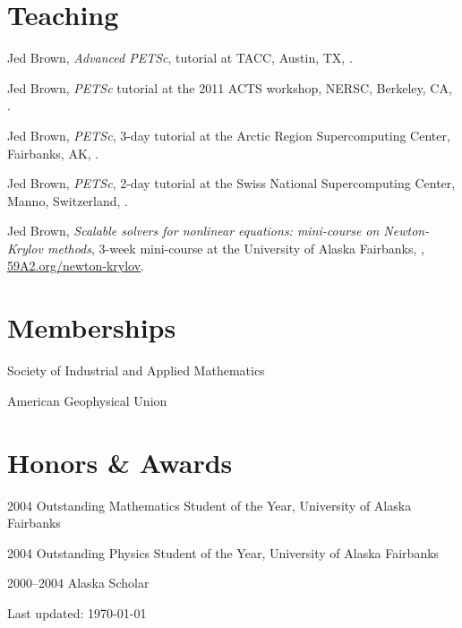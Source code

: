 \documentclass[10pt,letterpaper]{article}
\newcommand\ptitle[1]{\textit{#1}} %
\renewenvironment{itemize}{
  \begin{list}{}{
    \setlength{\leftmargin}{1.5em}
    \setlength{\itemsep}{0.25em}
    \setlength{\parskip}{0pt}
    \setlength{\parsep}{0.25em}
  }
}{
  \end{list}
}
\begin{document}
\section*{Teaching}
\begin{itemize}
\item Jed Brown, \ptitle{Advanced PETSc}, tutorial at TACC, Austin, TX, .
\item Jed Brown, \ptitle{PETSc} tutorial at the 2011 ACTS workshop, NERSC, Berkeley, CA, .
\item Jed Brown, \ptitle{PETSc}, 3-day tutorial at the Arctic Region Supercomputing Center, Fairbanks, AK, .
\item Jed Brown, \ptitle{PETSc}, 2-day tutorial at the Swiss National Supercomputing Center, Manno, Switzerland, .
\item Jed Brown, \ptitle{Scalable solvers for nonlinear equations: mini-course on Newton-Krylov methods}, 3-week mini-course at the University of Alaska Fairbanks, , \href{http://59A2.org/newton-krylov/}{\url{59A2.org/newton-krylov}}.
\end{itemize}

\section*{Memberships}
\begin{itemize}
\item Society of Industrial and Applied Mathematics
\item American Geophysical Union
\end{itemize}

\section*{Honors \& Awards}
\begin{itemize}
\item 2004 Outstanding Mathematics Student of the Year, University of Alaska Fairbanks
\item 2004 Outstanding Physics Student of the Year, University of Alaska Fairbanks
\item 2000--2004 Alaska Scholar
\end{itemize}

\begin{center}
  \begin{small}
    Last updated: \today
  \end{small}
\end{center}
\end{document}
